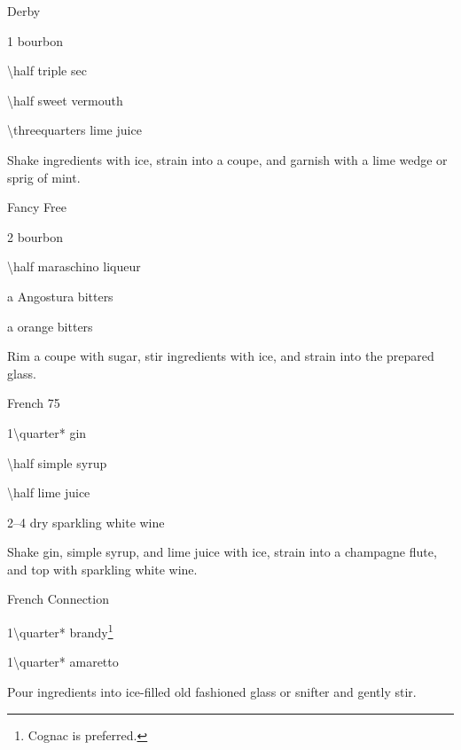 \begin{Cocktail}{Derby}
  \begin{Ingredients}
  \item \SI{1}{\oz} bourbon
  \item \SI{\half}{\oz} triple sec
  \item \SI{\half}{\oz} sweet vermouth
  \item \SI{\threequarters}{\oz} lime juice
  \end{Ingredients}
  
  \begin{Instructions}
	Shake ingredients with ice, strain into a coupe, and garnish with a lime wedge or sprig of mint.
  \end{Instructions}
\end{Cocktail}

\begin{Cocktail}{Fancy Free}
  \begin{Ingredients}
  \item \SI{2}{\oz} bourbon
  \item \SI{\half}{\oz} maraschino liqueur
  \item a \si{\dash} Angostura bitters
  \item a \si{\dash} orange bitters
  \end{Ingredients}
  
  \begin{Instructions}
	Rim a coupe with sugar, stir ingredients with ice, and strain into the prepared glass.
  \end{Instructions}
\end{Cocktail}

\begin{Cocktail}{French 75}
  \begin{Ingredients}
  \item \SI{1\quarter*}{\oz} gin
  \item \SI{\half}{\oz} simple syrup
  \item \SI{\half}{\oz} lime juice
  \item \SIrange{2}{4}{\oz} dry sparkling white wine
  \end{Ingredients}
  
  \begin{Instructions}
	Shake gin, simple syrup, and lime juice with ice, strain into a champagne flute, and top with sparkling white wine.
  \end{Instructions}
\end{Cocktail}

\begin{Cocktail}{French Connection}
  \begin{Ingredients}
  \item \SI{1\quarter*}{\oz} brandy\footnote{Cognac is preferred.}
  \item \SI{1\quarter*}{\oz} amaretto
  \end{Ingredients}
  
  \begin{Instructions}
	Pour ingredients into ice-filled old fashioned glass or snifter and gently stir.
  \end{Instructions}
\end{Cocktail}

